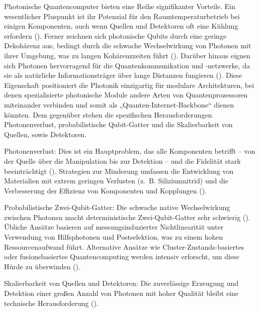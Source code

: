 Photonische Quantencomputer bieten eine Reihe signifikanter Vorteile. Ein wesentlicher Pluspunkt ist ihr Potenzial für den Raumtemperaturbetrieb bei einigen Komponenten, auch wenn Quellen und Detektoren oft eine Kühlung erfordern (\cite{abughanemPhotonicQuantumComputers2024}). Ferner zeichnen sich photonische Qubits durch eine geringe Dekohärenz aus, bedingt durch die schwache Wechselwirkung von Photonen mit ihrer Umgebung, was zu langen Kohärenzzeiten führt (\cite{abughanemPhotonicQuantumComputers2024}). Darüber hinaus eignen sich Photonen hervorragend für die Quantenkommunikation und -netzwerke, da sie als natürliche Informationsträger über lange Distanzen fungieren (\cite{abughanemPhotonicQuantumComputers2024}). Diese Eigenschaft positioniert die Photonik einzigartig für modulare Architekturen, bei denen spezialisierte photonische Module andere Arten von Quantenprozessoren miteinander verbinden und somit als „Quanten-Internet-Backbone“ dienen könnten.
\newline
\newline
Dem gegenüber stehen die spezifischen Herausforderungen Photonenverlust, probabilistische Qubit-Gatter und die Skalierbarkeit von Quellen, sowie Detektoren.
\par 
Photonenverlust: 
Dies ist ein Hauptproblem, das alle Komponenten betrifft – von der Quelle über die Manipulation bis zur Detektion – und die Fidelität stark beeinträchtigt (\cite{LinearOpticsScalable}). Strategien zur Minderung umfassen die Entwicklung von Materialien mit extrem geringen Verlusten (z. B. Siliziumnitrid) und die Verbesserung der Effizienz von Komponenten und Kopplungen (\cite{salavrakosPhotonnativeQuantumAlgorithms2025}).

\par Probabilistische Zwei-Qubit-Gatter:
Die schwache native Wechselwirkung zwischen Photonen macht deterministische Zwei-Qubit-Gatter sehr schwierig (\cite{slussarenkoPhotonicQuantumInformation2019}). Übliche Ansätze basieren auf messungsinduzierter Nichtlinearität unter Verwendung von Hilfsphotonen und Postselektion, was zu einem hohen Ressourcenaufwand führt. Alternative Ansätze wie Cluster-Zustands-basiertes oder fusionsbasiertes Quantencomputing werden intensiv erforscht, um diese Hürde zu überwinden (\cite{salavrakosPhotonnativeQuantumAlgorithms2025}).

\par Skalierbarkeit von Quellen und Detektoren: 
Die zuverlässige Erzeugung und Detektion einer großen Anzahl von Photonen mit hoher Qualität bleibt eine technische Herausforderung (\cite{LinearOpticsScalable}).

